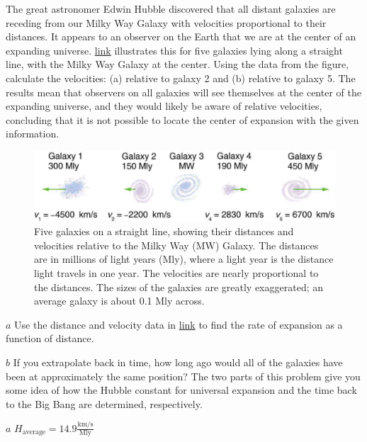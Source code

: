 \documentclass[
]{book}
\begin{document}
\hypertarget{fs-id2150516}{}
\leavevmode{}%
The great astronomer Edwin Hubble discovered that all distant galaxies
are receding from our Milky Way Galaxy with velocities proportional to
their distances. It appears to an observer on the Earth that we are at
the center of an expanding universe.
\protect\hyperlink{import-auto-id1915192}{link} illustrates this
for five galaxies lying along a straight line, with the Milky Way Galaxy
at the center. Using the data from the figure, calculate the velocities:
(a) relative to galaxy 2 and (b) relative to galaxy 5. The results mean
that observers on all galaxies will see themselves at the center of the
expanding universe, and they would likely be aware of relative
velocities, concluding that it is not possible to locate the center of
expansion with the given information.

\begin{figure}
\hypertarget{import-auto-id1915192}{%
\centering
\includegraphics{images/Figure_03_05_07.jpg}
\caption{Five galaxies on a straight line, showing their distances and
velocities relative to the Milky Way (MW) Galaxy. The distances are in
millions of light years (Mly), where a light year is the distance light
travels in one year. The velocities are nearly proportional to the
distances. The sizes of the galaxies are greatly exaggerated; an average
galaxy is about 0.1 Mly
across.}\label{import-auto-id1915192}
}
\end{figure}

\hypertarget{fs-id1781067}{}
\leavevmode{}%
\(a\) Use the distance and velocity data in
\protect\hyperlink{import-auto-id1915192}{link} to find the rate
of expansion as a function of distance.

\(b\) If you extrapolate back in time, how long ago would all of the
galaxies have been at approximately the same position? The two parts of
this problem give you some idea of how the Hubble constant for universal
expansion and the time back to the Big Bang are determined,
respectively.

\leavevmode{}%
\(a\)
\({H_{\text{average}} =}{\text{14}\text{.}\text{9}\frac{\text{km/s}}{\text{Mly}}}{}\)
\end{document}
